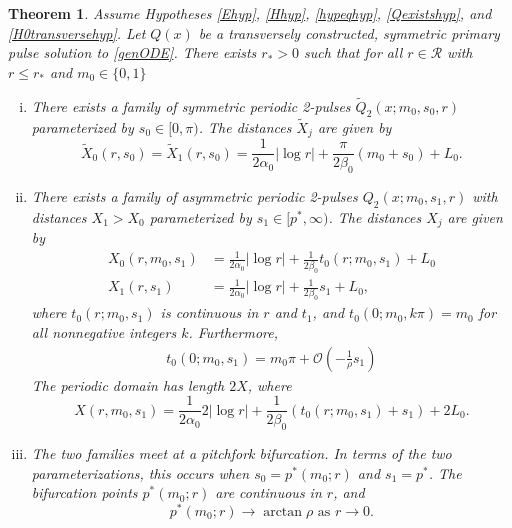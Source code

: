 \documentclass[11pt,reqno]{amsart}
\theoremstyle{plain}
\newtheorem{theorem}{Theorem}
\theoremstyle{definition}
\theoremstyle{remark}
\begin{document}
\begin{theorem}\label{2pulsebifurcation}
Assume Hypotheses \ref{Ehyp}, \ref{Hhyp}, \ref{hypeqhyp}, \ref{Qexistshyp}, and \ref{H0transversehyp}. Let $Q(x)$ be a transversely constructed, symmetric primary pulse solution to \eqref{genODE}. There exists $r_* > 0$ such that for all $r \in \mathcal{R}$ with $r \leq r_*$ and $m_0 \in \{0, 1\}$
\begin{enumerate}[(i)]
	\item There exists a family of symmetric periodic 2-pulses $\tilde{Q}_2(x; m_0, s_0, r)$ parameterized by $s_0 \in [0, \pi)$. The distances $\tilde{X}_j$ are given by
	\begin{equation}\label{2psymmdist}
		\tilde{X}_0(r, s_0) = \tilde{X}_1(r, s_0) = \frac{1}{2 \alpha_0} |\log r| + \frac{\pi}{2\beta_0} (m_0 + s_0) + L_0.
	\end{equation}
	\item There exists a family of asymmetric periodic 2-pulses $Q_2(x; m_0, s_1, r)$ with distances $X_1 > X_0$ parameterized by $s_1 \in [p^*, \infty)$. The distances $X_j$ are given by
	\begin{equation}\label{2pasymmdist}
	\begin{aligned}
		X_0(r, m_0, s_1) &= \frac{1}{2 \alpha_0} |\log r| + \frac{1}{2\beta_0} t_0(r; m_0, s_1) + L_0 \\
		X_1(r, s_1) &= \frac{1}{2 \alpha_0} |\log r| + \frac{1}{2\beta_0} s_1 + L_0, 
	\end{aligned}
	\end{equation}
	where $t_0(r; m_0, s_1)$ is continuous in $r$ and $t_1$, and $t_0(0; m_0, k \pi) = m_0$ for all nonnegative integers $k$. Furthermore,
	\begin{align}\label{deft0}
	t_0(0; m_0, s_1) = m_0 \pi + \mathcal{O}\left(-\frac{1}{\rho} s_1 \right)
	\end{align}
	The periodic domain has length $2X$, where
	\begin{equation}\label{X2pdomain}
	X(r, m_0, s_1) = \frac{1}{2 \alpha_0} 2 |\log r| + \frac{1}{2\beta_0} \left( t_0(r; m_0, s_1) + s_1\right) + 2 L_0.
	\end{equation}

	\item The two families meet at a pitchfork bifurcation. In terms of the two parameterizations, this occurs when $s_0 = p^*(m_0; r)$ and $s_1 = p^*$. The bifurcation points $p^*(m_0; r)$ are continuous in $r$, and
	\[
	p^*(m_0; r) \rightarrow \arctan \rho \text{ as }r \rightarrow 0.
	\]
\end{enumerate}
\end{theorem}
\end{document}
